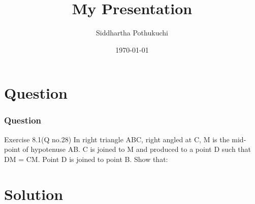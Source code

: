 \documentclass{beamer}
\title{My Presentation}
\author{Siddhartha Pothukuchi}
\institute{Indian Institute of Technology, Bhilai.}
\date{\today}
\begin{document}
\begin{frame}
\titlepage
\end{frame}


\section{Question}
\begin{frame}
\frametitle{Question}
\begin{block}{Exercise 8.1(Q no.28)}
In right triangle ABC, right angled at C, M is
the mid-point of hypotenuse AB. C is joined to
M and produced to a point D such that DM =
CM. Point D is joined to point B. Show that:
\newline
\hyperlink{a}{}
\newline
\hyperlink{b}{}
\newline
\hyperlink{c}{}
\newline
\hyperlink{d}{}

\end{block}
\end{frame}

\section{Solution}
\end{document}
